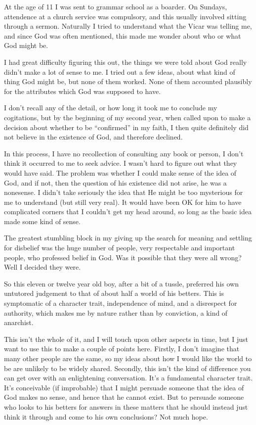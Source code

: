 
At the age of 11 I was sent to grammar school as a boarder.
On Sundays, attendence at a church service was compulsory, and this usually involved sitting through a sermon.
Naturally I tried to understand what the Vicar was telling me, and since God was often mentioned, this made me wonder about who or what God might be.

I had great difficulty figuring this out, the things we were told about God really didn't make a lot of sense to me.
I tried out a few ideas, about what kind of thing God might be, but none of them worked.
None of them accounted plausibly for the attributes which God was supposed to have.

I don't recall any of the detail, or how long it took me to conclude my cogitations, but by the beginning of my second year, when called upon to make a decision about whether to be ``confirmed'' in my faith, I then quite definitely did not believe in the existence of God, and therefore declined.

In this process, I have no recollection of consulting any book or person, I don't think it occurred to me to seek advice.
I wasn't hard to figure out what they would have said.
The problem was whether I could make sense of the idea of God, and if not, then the question of his existence did not arise, he was a nonesense.
I didn't take seriously the idea that He might be too mysterious for me to understand (but still very real).
It would have been OK for him to have complicated corners that I couldn't get my head around, so long as the basic idea made some kind of sense.

The greatest stumbling block in my giving up the search for meaning and settling for disbelief was the huge number of people, very respectable and important people, who professed belief in God.
Was it possible that they were all wrong?
Well I decided they were.

So this eleven or twelve year old boy, after a bit of a tussle, preferred his own untutored judgement to that of about half a world of his betters.
This is symptomatic of a character trait, independence of mind, and a disrespect for authority, which makes me by nature rather than by conviction, a kind of anarchist.

This isn't the whole of it, and I will touch upon other aspects in time, but I just want to use this to make a couple of points here.
Firstly, I don't imagine that many other people are the same, so my ideas about how I would like the world to be are unlikely to be widely shared.
Secondly, this isn't the kind of difference you can get over with an enlightening conversation.
It's a fundamental character trait.
It's conceivable (if improbable) that I might persuade someone that the idea of God makes no sense, and hence that he cannot exist.
But to persuade someone who looks to his betters for answers in these matters that he should instead just think it through and come to his own conclusions?
Not much hope.

